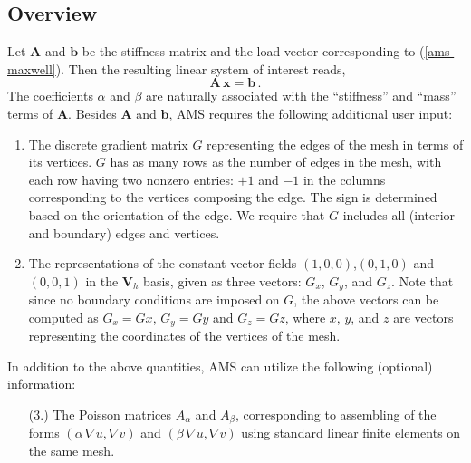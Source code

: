 \subsection{Overview}
Let ${\mathbf A}$ and ${\mathbf b}$ be the stiffness matrix and  the
load vector corresponding to (\ref{ams-maxwell}). Then the resulting
linear system of interest reads,
\begin{equation} \label{ams-maxwell-ls}
{\mathbf A}\, {\mathbf x} = {\mathbf b} \,.
\end{equation}
The coefficients $\alpha$ and $\beta$ are naturally associated with
the ``stiffness'' and ``mass'' terms of ${\mathbf A}$.
Besides ${\mathbf A}$ and ${\mathbf b}$, AMS requires the following
additional user input:
\begin{enumerate}
\item The discrete gradient matrix $G$ representing the edges of
the mesh in terms of its vertices. $G$ has as many rows as the number
of edges in the mesh, with each row having two nonzero entries:
$+1$ and $-1$ in the columns corresponding to the vertices composing
the edge. The sign is determined based on the orientation of the edge.
We require that $G$ includes all (interior and boundary) edges
and vertices.

\item The representations of the constant vector fields $(1,0,0)$,$(0,1,0)$ and
$(0,0,1)$ in the ${\mathbf V}_h$ basis, given as three vectors: $G_x$, $G_y$, and $G_z$.
Note that since no boundary conditions are imposed on $G$, the above vectors
can be computed as $G_x = G x$, $G_y = G y$ and $G_z = G z$, where
$x$, $y$, and $z$ are vectors representing the coordinates of the vertices of the mesh.
\end{enumerate}

In addition to the above quantities, AMS can utilize
the following (optional) information:
\begin{enumerate}
\item[(3.)] The Poisson matrices $A_\alpha$ and $A_\beta$, corresponding to
assembling of the forms $(\alpha\, \nabla u, \nabla v)$
and $(\beta\, \nabla u, \nabla v)$ using standard linear finite elements on
the same mesh.
\end{enumerate}

